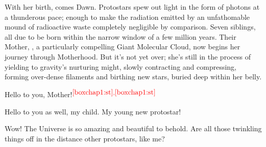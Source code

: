 \documentclass[main.tex]{subfiles}
\begin{document}
\par \nar With her birth, comes Dawn.  Protostars spew out light in the form of photons at a thunderous pace; enough to make the radiation emitted by an unfathomable mound of radioactive waste completely negligible by comparison.  Seven siblings, all due to be born within the narrow window of a few million years. Their Mother, \rmpleione, a particularly compelling Giant Molecular Cloud, now begins her journey through Motherhood.  But it's not yet over; she's still in the process of yielding to gravity's nurturing might, slowly contracting and compressing, forming over-dense filaments and birthing new stars, buried deep within her belly.  


\par \Maia Hello to you, Mother!$^{\textcolor{red}{{\ref{boxchap1:st}},\textcolor{red}{\ref{boxchap1:st}}}}$

\par \Pleione Hello to you as well, my child.  My young new protostar!

\par \Maia Wow!  The Universe is so amazing and beautiful to behold.  Are all those twinkling things off in the distance other protostars, like me?
\end{document}
